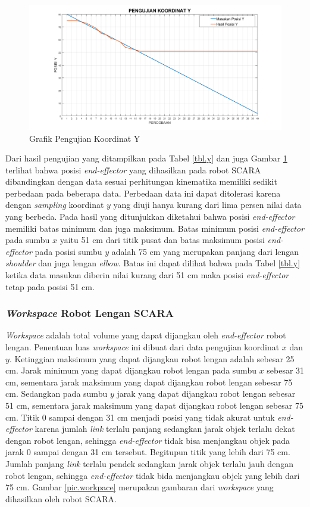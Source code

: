  \begin{figure}[H]
 	\centering
 	\includegraphics[width=13cm]{gambar/py.png}
 	\caption{Grafik Pengujian Koordinat Y}
 	\label{pic.koordinaty}
 \end{figure}


Dari hasil pengujian yang ditampilkan pada Tabel \ref{tbl.y} dan juga Gambar \ref{pic.koordinaty} terlihat bahwa posisi \textit{end-effector} yang dihasilkan pada robot SCARA dibandingkan dengan data sesuai perhitungan kinematika memiliki sedikit perbedaan pada beberapa data. Perbedaan data ini dapat ditolerasi karena dengan \textit{sampling} koordinat $y$ yang diuji hanya kurang dari lima persen nilai data yang berbeda. Pada hasil yang ditunjukkan diketahui bahwa posisi \textit{end-effector} memiliki batas minimum dan juga maksimum. Batas minimum posisi \textit{end-effector} pada sumbu $x$ yaitu 51 cm dari titik pusat dan batas maksimum posisi \textit{end-effector} pada posisi sumbu $y$ adalah 75 cm yang merupakan panjang dari lengan \textit{shoulder} dan juga lengan \textit{elbow}.  Batas ini dapat dilihat bahwa pada Tabel \ref{tbl.y} ketika data masukan diberin nilai kurang dari 51 cm maka posisi \textit{end-effector} tetap pada posisi 51 cm.
\subsubsection{\textit{Workspace} Robot Lengan SCARA }
\textit{Workspace} adalah total volume yang dapat dijangkau oleh \textit{end-effector} robot lengan. Penentuan luas \textit{workspace} ini dibuat dari data pengujian koordinat $x$ dan $y$. Ketinggian maksimum yang dapat dijangkau robot lengan adalah sebesar 25 cm. Jarak minimum yang dapat dijangkau robot lengan pada sumbu $x$ sebesar 31 cm, sementara jarak maksimum yang dapat dijangkau robot lengan sebesar 75 cm. Sedangkan pada sumbu $y$ jarak yang dapat dijangkau robot lengan sebesar 51 cm, sementara jarak maksimum yang dapat dijangkau robot lengan sebesar 75 cm. Titik 0 sampai dengan 31 cm menjadi posisi yang tidak akurat untuk \textit{end-effector} karena jumlah \textit{link} terlalu panjang sedangkan jarak objek terlalu dekat dengan robot lengan, sehingga \textit{end-effector} tidak bisa menjangkau objek pada jarak 0 sampai dengan 31 cm tersebut. Begitupun titik yang lebih dari 75 cm. Jumlah panjang \textit{link} terlalu pendek sedangkan jarak objek terlalu jauh dengan robot lengan, sehingga \textit{end-effector} tidak bida menjangkau objek yang lebih dari 75 cm. Gambar \ref{pic.workpace} merupakan gambaran dari \textit{workspace} yang dihasilkan oleh robot SCARA.


